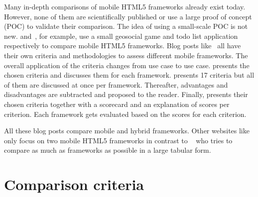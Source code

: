 \documentclass[a4paper]{artikel3}
\begin{document}
Many in-depth comparisons of mobile HTML5 frameworks already exist today.  
However, none of them are scientifically published or use a large proof of concept (POC) to validate their comparison.  
The idea of using a small-scale POC is not new.  
\cite{Oeflman2011} and~\cite{Kosmaczewski2012},  for example,  use a small geosocial game and todo list application respectively to compare mobile HTML5 frameworks.
Blog posts like~\cite{Sarrafi2012a,Ayuso2012,Rozynski2011} all have their own criteria and methodologies to assess different mobile frameworks.  
The overall application of the criteria changes from use case to use case.  
\cite{Rozynski2011} presents the chosen criteria and discusses them for each framework.  
\cite{Ayuso2012} presents 17 criteria but all of them are discussed at once per framework.  
Thereafter,  advantages and disadvantages are subtracted and proposed to the reader.  
Finally, \cite{Sarrafi2012a} presents their chosen criteria together with a scorecard and an explanation of scores per criterion.  
Each framework gets evaluated based on the scores for each criterion.

All these blog posts compare mobile and hybrid frameworks.  
Other websites like~\cite{Bristowe2012,Burris} only focus on two mobile HTML5 frameworks in contrast to ~\cite{Falk2011} who tries to compare as much as frameworks as possible in a large tabular form.



\section{Comparison criteria} %
\label{sec:comparisoncriteria}
\end{document}
